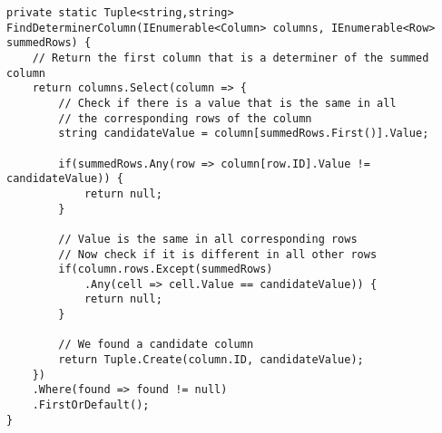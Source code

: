 \begin{lstlisting}[float,caption={FindDeterminerColumn method}, label={lst:finddeterminercolumn}]
private static Tuple<string,string> FindDeterminerColumn(IEnumerable<Column> columns, IEnumerable<Row> summedRows) {
	// Return the first column that is a determiner of the summed column
	return columns.Select(column => {
		// Check if there is a value that is the same in all
		// the corresponding rows of the column
		string candidateValue = column[summedRows.First()].Value;
		
		if(summedRows.Any(row => column[row.ID].Value != candidateValue)) {
			return null;
		}
		
		// Value is the same in all corresponding rows
		// Now check if it is different in all other rows
		if(column.rows.Except(summedRows)
			.Any(cell => cell.Value == candidateValue)) {
			return null;
		}
		
		// We found a candidate column
		return Tuple.Create(column.ID, candidateValue);
	})
	.Where(found => found != null)
	.FirstOrDefault();
}


\end{lstlisting}


